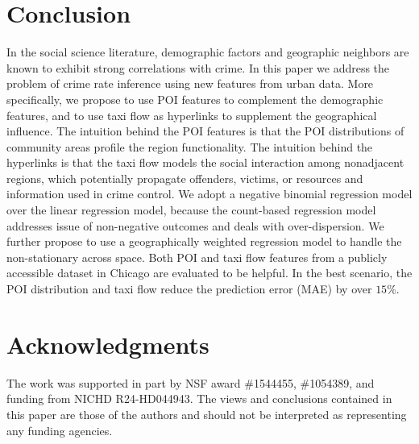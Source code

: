 
\section{Conclusion}
\label{ch5-sec:conclusion}

In the social science literature, demographic factors and geographic neighbors are known to exhibit strong correlations with crime.
In this paper we address the problem of crime rate inference using new features from urban data. More specifically, we propose to use POI features to complement the demographic features, and to use taxi flow as hyperlinks to supplement the geographical influence. The intuition behind the POI features is that the POI distributions of community areas profile the region functionality. The intuition behind the hyperlinks is that the taxi flow models the social interaction among nonadjacent regions, which potentially propagate offenders, victims, or resources and information used in crime control. We adopt a negative binomial regression model over the linear regression model, because the count-based regression model addresses issue of non-negative outcomes and deals with over-dispersion. We further propose to use a geographically weighted regression model to handle the non-stationary across space. Both POI and taxi flow features from a publicly accessible dataset in Chicago are evaluated to be helpful. In the best scenario, the POI distribution and taxi flow reduce the prediction error (MAE) by over $15\%$. 


\section*{Acknowledgments}


The work was supported in part by NSF award \#1544455, \#1054389, and funding from NICHD R24-HD044943. The views and conclusions contained in this paper are those of the authors and should not be interpreted as representing any funding agencies.
